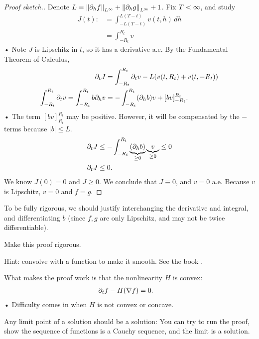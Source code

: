 \begin{proof}[Proof sketch.]
Denote $L=\left\Vert {\partial_h f}\right\Vert_{L^\infty}+\left\Vert {\partial_h g}\right\Vert_{L^\infty} + 1$. 
Fix $T<\infty$, and study
\begin{align*}
J(t) :&= \int_{-L(T-t)}^{L(T-t)} v(t,h)\,dh\\
&= \int_{-R_t}^{R_t} v
\end{align*}•
Note $J$ is Lipschitz in $t$, so it has a derivative a.e. By the Fundamental Theorem of Calculus,
\begin{align*}
\partial_t J &=\int_{-R_t}^{R_t} \partial_t v - L(v(t,R_t)+v(t,-R_t))\\
\int_{-R_t}^{R_t} \partial_t v=\int_{-R_t}^{R_t} b \partial_h v
&=-\int_{-R_t}^{R_t} (\partial_h b)v + [bv]_{-R_t}^{R_t}.
\end{align*}•
The term $[bv]^{R_t}_{R_t}$ may be positive. %
However, it will be compensated by the $-$ terms because $|b|\le L$.
\begin{align*}
\partial_t J &\le -\int_{-R_t}^{R_t} \underbrace{(\partial_h b)}_{\ge 0}\underbrace{v}_{\ge 0}\le 0\\
\partial_t J&\le 0.
\end{align*}
We know $J(0)=0$ and $J\ge 0$. We conclude that $J\equiv 0$, and $v=0$ a.e. Because $v$ is Lipschitz, $v=0$ and $f=g$.
\end{proof}
To be fully rigorous, we should justify interchanging the derivative and integral, and differentiating $b$ (since $f,g$ are only Lipschitz, and may not be twice differentiable).
\begin{exr}
Make this proof rigorous.

Hint: convolve with a function to make it smooth. See the book \cite{evans2010partial}.
\end{exr}
What makes the proof work is that the nonlinearity $H$ is convex:
\begin{align*}
\partial_t f - H(\nabla f)&=0.
\end{align*}•
Difficulty comes in when $H$ is not convex or concave.

Any limit point of a solution should be a solution: You can try to run the proof, show the sequence of functions is a Cauchy sequence, and the limit is a solution.

